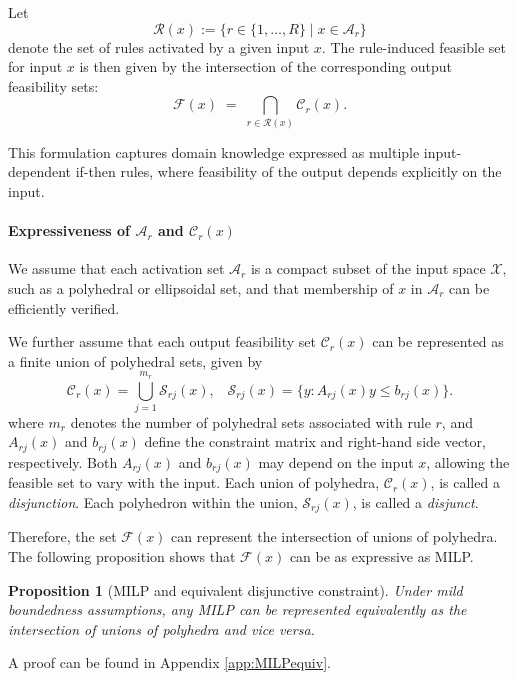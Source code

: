 \documentclass{article}
\theoremstyle{plain}
\newtheorem{proposition}[theorem]{Proposition}
\theoremstyle{definition}
\theoremstyle{remark}
\begin{document}
Let
\[
\mathcal{R}(x) := \{ r \in \{1,\dots,R\} \mid x \in \mathcal{A}_r \}
\]
denote the set of rules activated by a given input $x$. The rule-induced feasible set for input $x$ is then given by the intersection of the corresponding output feasibility sets:
\begin{equation}
\mathcal{F}(x)
\;=\;
\bigcap_{r \in \mathcal{R}(x)} \mathcal{C}_r(x).
\label{eq:rule_feasible_set}
\end{equation}

This formulation captures domain knowledge expressed as multiple input-dependent if-then rules, where feasibility of the output depends explicitly on the input.

\paragraph{Expressiveness of $\mathcal{A}_r$ and $\mathcal{C}_r(x)$}
We assume that each activation set $\mathcal{A}_r$ is a compact subset of the input space $\mathcal{X}$, such as a polyhedral or ellipsoidal set, and that membership of $x$ in $\mathcal{A}_r$ can be efficiently verified.

We further assume that each output feasibility set $\mathcal{C}_r(x)$ can be represented as a finite union of polyhedral sets, given by
\begin{equation} \mathcal{C}_r(x) = \bigcup_{j=1}^{m_r} \mathcal{S}_{rj}(x), \;\;\; \mathcal{S}_{rj}(x) = \{ y : A_{rj}(x) y \le b_{rj}(x) \}. \label{eq:union_polyhedra} \end{equation}
where $m_r$ denotes the number of polyhedral sets associated with rule $r$, and $A_{rj}(x)$ and $b_{rj}(x)$ define the constraint matrix and right-hand side vector, respectively. Both $A_{rj}(x)$ and $b_{rj}(x)$ may depend on the input $x$, allowing the feasible set to vary with the input. Each union of polyhedra, $\mathcal{C}_r(x)$, is called a \emph{disjunction}. Each polyhedron within the union, $\mathcal{S}_{rj}(x)$, is called a \emph{disjunct}.  

Therefore, the set $\mathcal{F}(x)$ can represent the intersection of unions of polyhedra. The following proposition shows that $\mathcal{F}(x)$ can be as expressive as MILP.
\begin{proposition}[MILP and equivalent disjunctive constraint]\label{prop:MILPequivalent}
Under mild boundedness assumptions, any MILP can be represented equivalently as the intersection of unions of polyhedra and vice versa.
\end{proposition}
A proof can be found in Appendix \ref{app:MILPequiv}.
\end{document}
